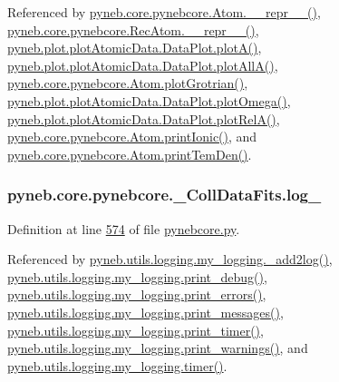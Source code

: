 Referenced by \hyperlink{pynebcore_8py_source_l02615}{pyneb.\-core.\-pynebcore.\-Atom.\-\_\-\-\_\-repr\-\_\-\-\_\-()}, \hyperlink{pynebcore_8py_source_l03154}{pyneb.\-core.\-pynebcore.\-Rec\-Atom.\-\_\-\-\_\-repr\-\_\-\-\_\-()}, \hyperlink{plot_atomic_data_8py_source_l00117}{pyneb.\-plot.\-plot\-Atomic\-Data.\-Data\-Plot.\-plot\-A()}, \hyperlink{plot_atomic_data_8py_source_l00189}{pyneb.\-plot.\-plot\-Atomic\-Data.\-Data\-Plot.\-plot\-All\-A()}, \hyperlink{pynebcore_8py_source_l02443}{pyneb.\-core.\-pynebcore.\-Atom.\-plot\-Grotrian()}, \hyperlink{plot_atomic_data_8py_source_l00373}{pyneb.\-plot.\-plot\-Atomic\-Data.\-Data\-Plot.\-plot\-Omega()}, \hyperlink{plot_atomic_data_8py_source_l00262}{pyneb.\-plot.\-plot\-Atomic\-Data.\-Data\-Plot.\-plot\-Rel\-A()}, \hyperlink{pynebcore_8py_source_l02233}{pyneb.\-core.\-pynebcore.\-Atom.\-print\-Ionic()}, and \hyperlink{pynebcore_8py_source_l02324}{pyneb.\-core.\-pynebcore.\-Atom.\-print\-Tem\-Den()}.

\hypertarget{classpyneb_1_1core_1_1pynebcore_1_1___coll_data_fits_a42f3e78e841a8714f2602866843d77da}{
\subsubsection[{log\-\_\-}]{\setlength{\rightskip}{0pt plus 5cm}pyneb.\-core.\-pynebcore.\-\_\-\-Coll\-Data\-Fits.\-log\-\_\-}}\label{classpyneb_1_1core_1_1pynebcore_1_1___coll_data_fits_a42f3e78e841a8714f2602866843d77da}


Definition at line \hyperlink{pynebcore_8py_source_l00574}{574} of file \hyperlink{pynebcore_8py_source}{pynebcore.\-py}.



Referenced by \hyperlink{logging_8py_source_l00059}{pyneb.\-utils.\-logging.\-my\-\_\-logging.\-\_\-add2log()}, \hyperlink{logging_8py_source_l00157}{pyneb.\-utils.\-logging.\-my\-\_\-logging.\-print\-\_\-debug()}, \hyperlink{logging_8py_source_l00149}{pyneb.\-utils.\-logging.\-my\-\_\-logging.\-print\-\_\-errors()}, \hyperlink{logging_8py_source_l00133}{pyneb.\-utils.\-logging.\-my\-\_\-logging.\-print\-\_\-messages()}, \hyperlink{logging_8py_source_l00165}{pyneb.\-utils.\-logging.\-my\-\_\-logging.\-print\-\_\-timer()}, \hyperlink{logging_8py_source_l00141}{pyneb.\-utils.\-logging.\-my\-\_\-logging.\-print\-\_\-warnings()}, and \hyperlink{logging_8py_source_l00115}{pyneb.\-utils.\-logging.\-my\-\_\-logging.\-timer()}.

